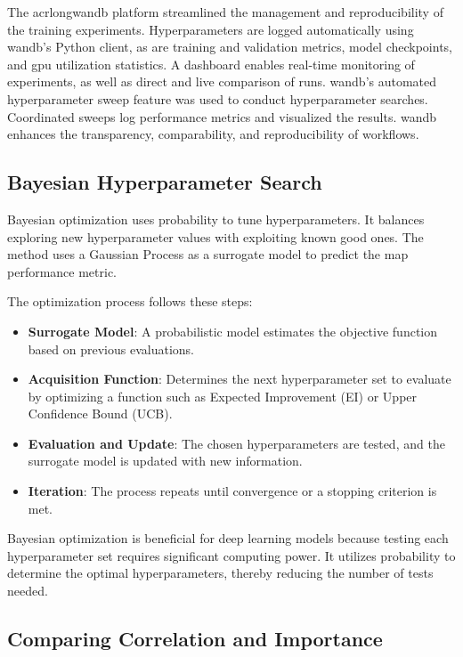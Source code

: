 The acrlong{wandb} platform streamlined the management and reproducibility of the training experiments. Hyperparameters are logged automatically using \acrshort{wandb}'s Python client, as are training and validation metrics, model checkpoints, and \acrshort{gpu} utilization statistics. A dashboard enables real-time monitoring of experiments, as well as direct and live comparison of runs. \acrshort{wandb}'s automated hyperparameter sweep feature was used to conduct hyperparameter searches. Coordinated sweeps log performance metrics and visualized the results. \acrshort{wandb} enhances the transparency, comparability, and reproducibility of workflows. 

\subsection{Bayesian Hyperparameter Search}

Bayesian optimization uses probability to tune hyperparameters. It balances exploring new hyperparameter values with exploiting known good ones. The method uses a Gaussian Process as a surrogate model to predict the \acrlong{map} performance metric.


The optimization process follows these steps:
\begin{itemize}
    \item \textbf{Surrogate Model}: A probabilistic model estimates the objective function based on previous evaluations.
    \item \textbf{Acquisition Function}: Determines the next hyperparameter set to evaluate by optimizing a function such as Expected Improvement (EI) or Upper Confidence Bound (UCB).
    \item \textbf{Evaluation and Update}: The chosen hyperparameters are tested, and the surrogate model is updated with new information.
    \item \textbf{Iteration}: The process repeats until convergence or a stopping criterion is met.
\end{itemize}

Bayesian optimization is beneficial for deep learning models because testing each hyperparameter set requires significant computing power. It utilizes probability to determine the optimal hyperparameters, thereby reducing the number of tests needed.


\subsection{Comparing Correlation and Importance}

